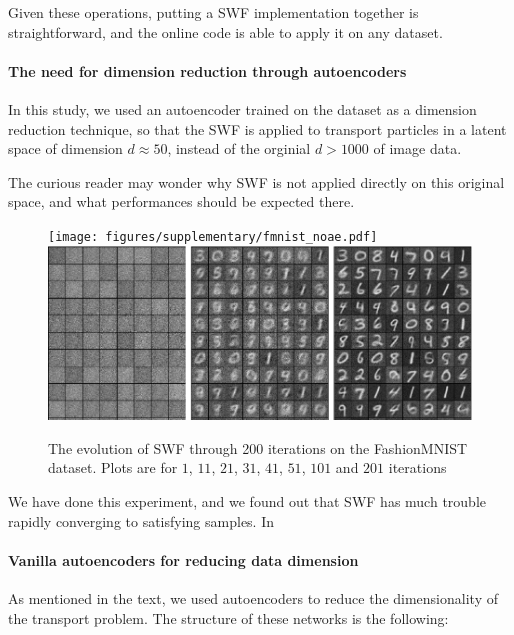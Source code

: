 Given these operations, putting a SWF implementation together is straightforward, and the online code is able to apply it on any dataset.

\paragraph{The need for dimension reduction through autoencoders}

In this study, we used an autoencoder trained on the dataset as a dimension reduction technique, so that the SWF is applied to transport particles in a latent space of dimension $d\approx 50$, instead of the orginial $d>1000$ of image data.

The curious reader may wonder why SWF is not applied directly on this original space, and what performances should be expected there.


\begin{figure}
\centering
\texttt{[image: figures/supplementary/fmnist\_noae.pdf]}
\includegraphics[width=\picwidth\columnwidth]{figures/supplementary/mnist_noae.pdf}
\caption{The evolution of SWF through 200 iterations on the FashionMNIST dataset. Plots are for $1$, $11$, $21$, $31$, $41$, $51$, $101$ and $201$ iterations}
\label{fig:suppnoae}
\end{figure}

We have done this experiment, and we found out that SWF has much trouble rapidly converging to satisfying samples. In

\paragraph{Vanilla autoencoders for reducing data dimension}

As mentioned in the text, we used autoencoders to reduce the dimensionality of the transport problem. The structure of these networks is the following:

